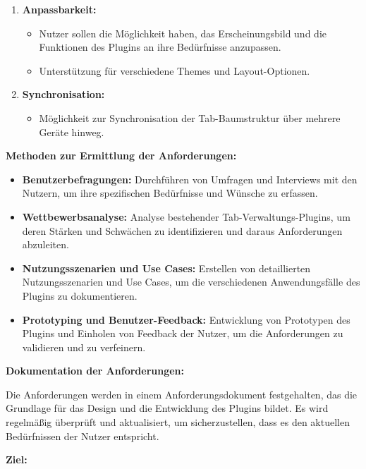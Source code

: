 \begin{enumerate}
    \item \textbf{Anpassbarkeit:}
    \begin{itemize}
        \item Nutzer sollen die Möglichkeit haben, das Erscheinungsbild und die Funktionen des Plugins an ihre Bedürfnisse anzupassen.
        \item Unterstützung für verschiedene Themes und Layout-Optionen.
    \end{itemize}
    
    \item \textbf{Synchronisation:}
    \begin{itemize}
        \item Möglichkeit zur Synchronisation der Tab-Baumstruktur über mehrere Geräte hinweg.
    \end{itemize}
\end{enumerate}

\textbf{Methoden zur Ermittlung der Anforderungen:}

\begin{itemize}
    \item \textbf{Benutzerbefragungen:} Durchführen von Umfragen und Interviews mit den Nutzern, um ihre spezifischen Bedürfnisse und Wünsche zu erfassen.
    \item \textbf{Wettbewerbsanalyse:} Analyse bestehender Tab-Verwaltungs-Plugins, um deren Stärken und Schwächen zu identifizieren und daraus Anforderungen abzuleiten.
    \item \textbf{Nutzungsszenarien und Use Cases:} Erstellen von detaillierten Nutzungsszenarien und Use Cases, um die verschiedenen Anwendungsfälle des Plugins zu dokumentieren.
    \item \textbf{Prototyping und Benutzer-Feedback:} Entwicklung von Prototypen des Plugins und Einholen von Feedback der Nutzer, um die Anforderungen zu validieren und zu verfeinern.
\end{itemize}

\textbf{Dokumentation der Anforderungen:}

Die Anforderungen werden in einem Anforderungsdokument festgehalten, das die Grundlage für das Design und die Entwicklung des Plugins bildet. Es wird regelmäßig überprüft und aktualisiert, um sicherzustellen, dass es den aktuellen Bedürfnissen der Nutzer entspricht.


\textbf{Ziel:}



